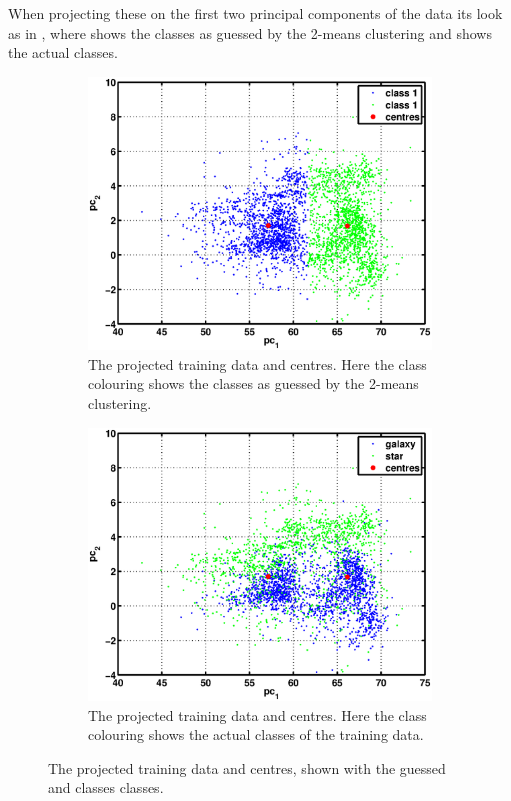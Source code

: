 \documentclass[a4paper, 11pt]{article}
\begin{document}
When projecting these on the first two principal components of the data its look as in , where  shows the classes as guessed by the 2-means clustering and  shows the actual classes.

\begin{figure}[H]
    \centering
    \begin{subfigure}[t]{0.48\textwidth}
    \includegraphics[width=\textwidth]{figures/question5_1}
        \caption{The projected training data and centres. Here the class colouring shows the classes as guessed by the 2-means clustering.}\label{fig:question5_1}
    \end{subfigure}
    \hspace{0.5em}
    \begin{subfigure}[t]{0.48\textwidth}
        \includegraphics[width=\textwidth]{figures/question5_2}
        \caption{The projected training data and centres. Here the class colouring shows the actual classes of the training data.}\label{fig:question5_2}
    \end{subfigure}
    \caption{The projected training data and centres, shown with the guessed and classes classes.}\label{fig:question5}
\end{figure}
\end{document}
